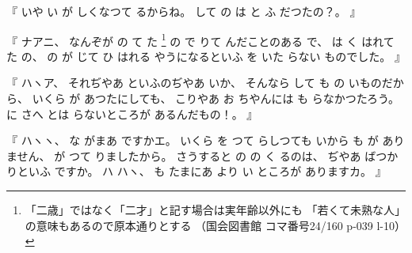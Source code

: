 
%
『
いや
い
が
しくなつて
るからね。
%
して
の
は
と
ふ
だつたの？。
』

%
『
ナアニ、
%
なんぞが
の
て
た
\footnote{「二歳」ではなく「二才」と記す場合は実年齢以外にも
「若くて未熟な人」の意味もあるので原本通りとする
（国会図書館 コマ番号24/160 p-039 l-10）}%
の
で
りて
んだことのある
で、
%
は
く
はれて
た
の、
%
の
が
じて
ひ
はれる
やうになるといふ
を
いた
らない
ものでした。
』

%
『
ハヽア、
%
それぢやあ
といふのぢやあ
いか、
%
そんなら
して
も
の
いものだから、
%
いくら
が
あつたにしても、
%
こりやあ
お
ちやんには
も
らなかつたろう。
%
に
さへ
とは
らないところが
あるんだもの！。
』

%
『
ハヽヽ、
%
な
がまあ
ですかエ。
%
いくら
を
つて
らしつても
いから
も
が
ありません、
%
%
が
つて
りましたから。
%
さうすると
の
%
の
く
るのは、
%
ぢやあ%
ばつかりといふ
ですか。
%
ハ
ハヽ、%
%
も
たまにあ
より
い
ところが
ありますカ。
』

